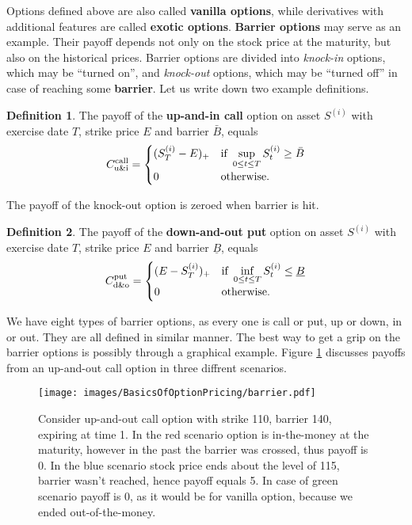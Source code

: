\documentclass[a4paper,12pt, oneside]{book}
\theoremstyle{definition}
\newtheorem{mydef}{Definition}[chapter]
\theoremstyle{remark}
\begin{document}
Options defined above are also called \textbf{vanilla options}, while derivatives with additional features are called \textbf{exotic options}. \textbf{Barrier options} may serve as an example. Their payoff depends not only on the stock price at the maturity, but also on the historical prices. Barrier options are divided into \textit{knock-in} options, which may be ``turned on'', and \textit{knock-out} options, which may be ``turned off'' in case of reaching some \textbf{barrier}. Let us write down two example definitions.
\begin{mydef}
The payoff of the \textbf{up-and-in call} option on asset $S^{(i)}$ with exercise date $T$, strike price $E$ and barrier $\bar{B}$, equals
\[ C^{\hbox{\scriptsize call}}_{\hbox{\scriptsize u\&i}} = 
\begin{cases}
 (S^{(i)}_T - E)_+    & \hbox{if } \sup\limits_{0 \leq t \leq T} S^{(i)}_t \geq \bar{B}\\
 0                    & \hbox{otherwise.}
\end{cases}
\]
\end{mydef}
\noindent The payoff of the knock-out option is zeroed when barrier is hit.
\begin{mydef}
The payoff of the \textbf{down-and-out put} option on asset $S^{(i)}$ with exercise date $T$, strike price $E$ and barrier $\underline{B}$, equals
\[ C^{\hbox{\scriptsize put}}_{\hbox{\scriptsize d\&o}} = 
\begin{cases}
 (E - S^{(i)}_T)_+    & \hbox{if } \inf\limits_{0 \leq t \leq T} S^{(i)}_t \leq \underline{B}\\
 0                    & \hbox{otherwise.}
\end{cases}
\]
\end{mydef}
We have eight types of barrier options, as every one is call or put, up or down, in or out. They are all defined in similar manner. The best way to get a grip on the barrier options is possibly through a graphical example. Figure \ref{fig:barrier} discusses payoffs from an up-and-out call option in three diffrent scenarios. 
\begin{figure}[!ht]
\centering
 \texttt{[image: images/BasicsOfOptionPricing/barrier.pdf]}
\caption{Consider up-and-out call option with strike 110, barrier 140, expiring at time 1. In the red scenario option is in-the-money at the maturity, however in the past the barrier was crossed, thus payoff is 0. In the blue scenario stock price ends about the level of 115, barrier wasn't reached, hence payoff equals 5. In case of green scenario payoff is 0, as it would be for vanilla option, because we ended out-of-the-money. }
\label{fig:barrier}
\end{figure}
\end{document}

